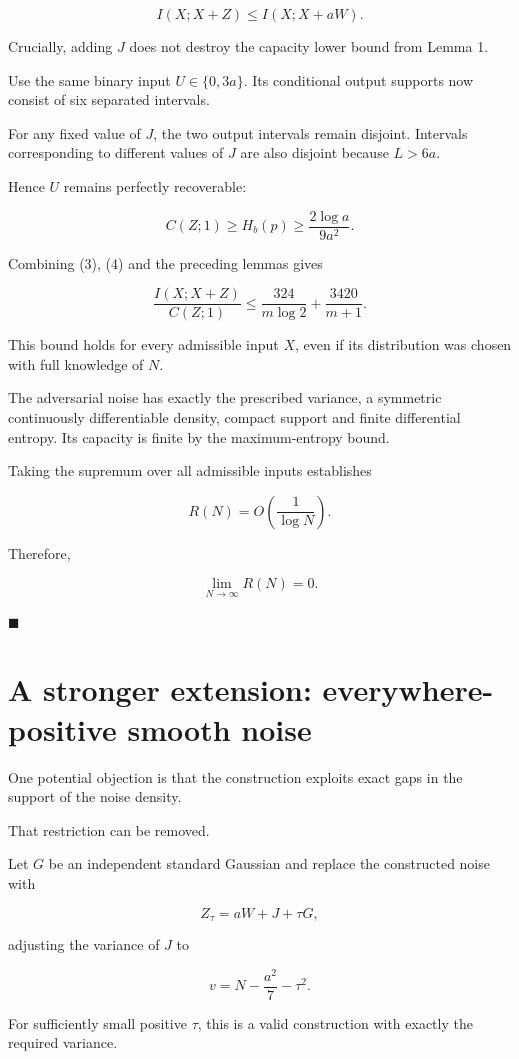 \documentclass[11pt]{article}
\begin{document}
\[
I(X;X+Z)\leq I(X;X+aW).
\tag{3}
\]

Crucially, adding \(J\) does not destroy the capacity lower bound from Lemma 1.

Use the same binary input \(U\in\{0,3a\}\). Its conditional output supports now consist of six separated intervals.

For any fixed value of \(J\), the two output intervals remain disjoint. Intervals corresponding to different values of \(J\) are also disjoint because \(L>6a\).

Hence \(U\) remains perfectly recoverable:

\[
C(Z;1)\geq H_b(p)
\geq\frac{2\log a}{9a^2}.
\tag{4}
\]

Combining (3), (4) and the preceding lemmas gives

\[
\boxed{
\frac{I(X;X+Z)}{C(Z;1)}
\leq
\frac{324}{m\log2}
+\frac{3420}{m+1}.
}
\]

This bound holds for every admissible input \(X\), even if its distribution was chosen with full knowledge of \(N\).

The adversarial noise has exactly the prescribed variance, a symmetric continuously differentiable density, compact support and finite differential entropy. Its capacity is finite by the maximum-entropy bound.

Taking the supremum over all admissible inputs establishes

\[
R(N)=O\left(\frac1{\log N}\right).
\]

Therefore,

\[
\boxed{\lim_{N\to\infty}R(N)=0.}
\]

\(\blacksquare\)

\section{A stronger extension: everywhere-positive smooth noise}

One potential objection is that the construction exploits exact gaps in the support of the noise density.

That restriction can be removed.

Let \(G\) be an independent standard Gaussian and replace the constructed noise with

\[
Z_\tau=aW+J+\tau G,
\]

adjusting the variance of \(J\) to

\[
v=N-\frac{a^2}{7}-\tau^2.
\]

For sufficiently small positive \(\tau\), this is a valid construction with exactly the required variance.
\end{document}
